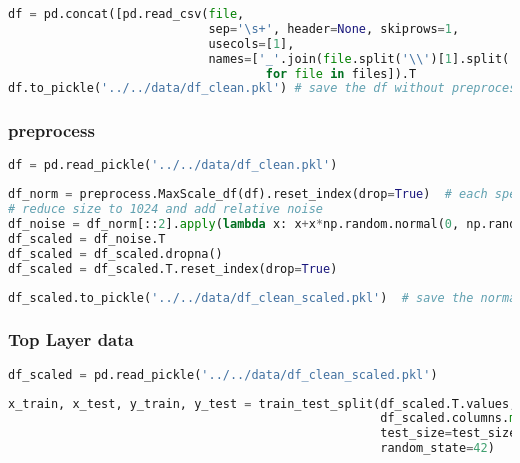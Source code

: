 \begin{lstlisting}[language=Python]
df = pd.concat([pd.read_csv(file,
                            sep='\s+', header=None, skiprows=1,
                            usecols=[1],
                            names=['_'.join(file.split('\\')[1].split('_')[:-1])]).T 
                                    for file in files]).T
df.to_pickle('../../data/df_clean.pkl') # save the df without preprocessing
\end{lstlisting}

\hypertarget{preprocess}{%
\subsubsection{preprocess}\label{preprocess}}

\begin{lstlisting}[language=Python]
df = pd.read_pickle('../../data/df_clean.pkl') 
\end{lstlisting}

\begin{lstlisting}[language=Python]
df_norm = preprocess.MaxScale_df(df).reset_index(drop=True)  # each spectrum is scaled to 1
# reduce size to 1024 and add relative noise
df_noise = df_norm[::2].apply(lambda x: x+x*np.random.normal(0, np.random.randint(1,3)*0.01 , len(x)))
df_scaled = df_noise.T
df_scaled = df_scaled.dropna()
df_scaled = df_scaled.T.reset_index(drop=True)
\end{lstlisting}

\begin{lstlisting}[language=Python]
df_scaled.to_pickle('../../data/df_clean_scaled.pkl')  # save the normalized, scaled df
\end{lstlisting}

\hypertarget{top-layer-data}{%
\subsubsection{Top Layer data}\label{top-layer-data}}

\begin{lstlisting}[language=Python]
df_scaled = pd.read_pickle('../../data/df_clean_scaled.pkl')
\end{lstlisting}

\begin{lstlisting}[language=Python]
x_train, x_test, y_train, y_test = train_test_split(df_scaled.T.values,
                                                    df_scaled.columns.map(lambda x: x.split('_')[0]), # first part of the filename is the top label
                                                    test_size=test_size_ratio,
                                                    random_state=42)
\end{lstlisting}


